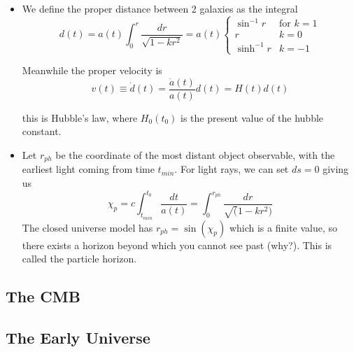 \documentclass[11pt]{article}
\begin{document}
\begin{itemize}
    \item We define the proper distance between 2 galaxies as the integral
    \[ 
        d(t) = a(t) \int^{r}_{0}\frac{dr}{\sqrt{1-kr^{2}}} = a(t) 
        \begin{cases}
        \sin^{-1}{r} & \text{for } k = 1 \\
        r & k = 0 \\
        \sinh^{-1}{r} & k = -1
        \end{cases}
    \]

    \noindent Meanwhile the proper velocity is 
    \[ 
        v(t) \equiv \dot{d}(t) = \frac{\dot{a}(t)}{a(t)}d(t) = H(t)d(t) 
    \]

    \noindent this is Hubble's law, where \( H_{0}(t_{0}) \) is the present value of the hubble constant.


    \item Let \( r_{ph} \) be the coordinate of the most distant object observable, with the earliest light coming from time \( t_{min} \).
    For light rays, we can set \( ds = 0 \) giving us 
    \[ 
        \chi_{p} = c\int^{t_{0}}_{t_{min}} \frac{dt}{a(t)} = \int^{r_{ph}}_0\frac{dr}{\sqrt(1-kr^{2})}
    \]
    The closed universe model has \( r_{ph} = \sin(\chi_{p}) \) which is a finite value, so there exists a horizon beyond which you cannot see
    past (why?). This is called the particle horizon.

\end{itemize}

\subsection{The CMB}

\subsection{The Early Universe}
\end{document}
